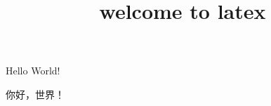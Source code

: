 \documentclass[12pt]{ctexart}
\title{welcome to latex}
\author{}
\date{}
\begin{document}
\maketitle

Hello World!

你好，世界！
\end{document}
